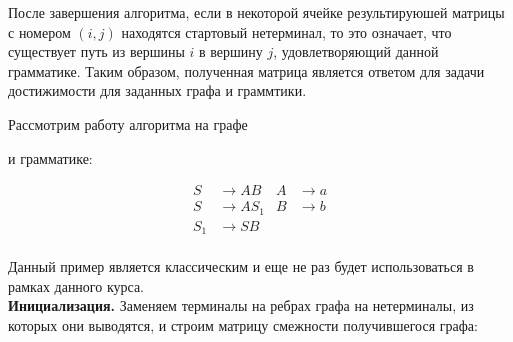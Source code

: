 После завершения алгоритма, если в некоторой ячейке результируюшей матрицы с номером $(i, j)$ находятся стартовый нетерминал, то это означает, что существует путь из вершины $i$ в вершину $j$, удовлетворяющий данной грамматике. Таким образом, полученная матрица является ответом для задачи достижимости для заданных графа и граммтики.

\begin{example}
\label{CYK_algorithm_ex}
Рассмотрим работу алгоритма на графе

\begin{center}
\end{center}

и грамматике:

\begin{align*}
S   & \to A B    & A   & \to a     \\
S   & \to A S_1  & B   & \to b\\
S_1 & \to S B   &&\\
\end{align*}

Данный пример является классическим и еще не раз будет использоваться в рамках данного курса. \\

\textbf{Инициализация.}
Заменяем терминалы на ребрах графа на нетерминалы, из которых они выводятся, и строим матрицу смежности получившегося графа:

\begin{center}
\end{center}


\end{example}
